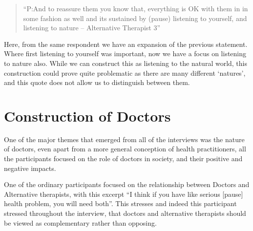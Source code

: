 \begin{quotation}
``P:And to reassure them you know that, everything is OK with them in in some fashion as well and its sustained by (pause) listening to yourself, and listening to nature – Alternative Therapist 3''  
\end{quotation}


Here, from the same respondent we have an expansion of the previous statement. Where first listening to yourself was important, now we have a focus on listening to nature also. While we can construct this as listening to the natural world, this construction could prove quite problematic as there are many different `natures', and this quote does not allow us to distinguish between them. 




\section{Construction of Doctors}
\label{sec:construction-doctors}

One of the major themes that emerged from all of the interviews was the nature of doctors, even apart from a more general conception of health practitioners, all the participants focused on the role of doctors in society, and their positive and negative impacts. 

One of the ordinary participants focused on the relationship between Doctors and Alternative therapists, with this excerpt ``I think if you have like serious [pause] health problem, you will need both''. This stresses and indeed this participant stressed throughout the interview, that doctors and alternative therapists should be viewed as complementary rather than opposing. 

